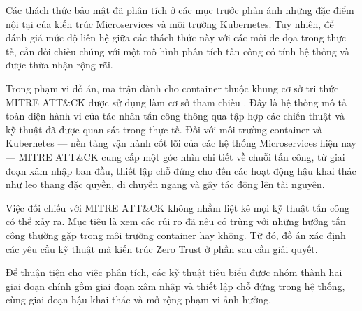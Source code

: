 Các thách thức bảo mật đã phân tích ở các mục trước phản ánh những đặc điểm nội tại của kiến trúc Microservices và môi trường Kubernetes. Tuy nhiên, để đánh giá mức độ liên hệ giữa các thách thức này với các mối đe dọa trong thực tế, cần đối chiếu chúng với một mô hình phân tích tấn công có tính hệ thống và được thừa nhận rộng rãi.

Trong phạm vi đồ án, ma trận dành cho container thuộc khung cơ sở tri thức MITRE ATT\&CK được sử dụng làm cơ sở tham chiếu \parencite{mitre_containers}. Đây là hệ thống mô tả toàn diện hành vi của tác nhân tấn công thông qua tập hợp các chiến thuật và kỹ thuật đã được quan sát trong thực tế. Đối với môi trường container và Kubernetes --- nền tảng vận hành cốt lõi của các hệ thống Microservices hiện nay --- MITRE ATT\&CK cung cấp một góc nhìn chi tiết về chuỗi tấn công, từ giai đoạn xâm nhập ban đầu, thiết lập chỗ đứng cho đến các hoạt động hậu khai thác như leo thang đặc quyền, di chuyển ngang và gây tác động lên tài nguyên.

Việc đối chiếu với MITRE ATT\&CK không nhằm liệt kê mọi kỹ thuật tấn công có thể xảy ra. Mục tiêu là xem các rủi ro đã nêu có trùng với những hướng tấn công thường gặp trong môi trường container hay không. Từ đó, đồ án xác định các yêu cầu kỹ thuật mà kiến trúc Zero Trust ở phần sau cần giải quyết.

Để thuận tiện cho việc phân tích, các kỹ thuật tiêu biểu được nhóm thành hai giai đoạn chính gồm giai đoạn xâm nhập và thiết lập chỗ đứng trong hệ thống, cùng giai đoạn hậu khai thác và mở rộng phạm vi ảnh hưởng.

